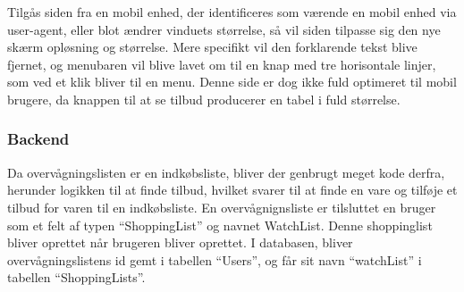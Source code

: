 Tilgås siden fra en mobil enhed, der identificeres som værende en mobil enhed via user-agent, eller blot ændrer vinduets størrelse, så vil siden tilpasse sig den nye skærm opløsning og størrelse.
Mere specifikt vil den forklarende tekst blive fjernet, og menubaren vil blive lavet om til en knap med tre horisontale linjer, som ved et klik bliver til en menu.
Denne side er dog ikke fuld optimeret til mobil brugere, da knappen til at se tilbud producerer en tabel i fuld størrelse. 
\subsubsection{Backend}
Da overvågningslisten er en indkøbsliste, bliver der genbrugt meget kode derfra, herunder logikken til at finde tilbud, hvilket svarer til at finde en vare og tilføje et tilbud for varen til en indkøbsliste. 
En overvågnignsliste er tilsluttet en bruger som et felt af typen ``ShoppingList'' og navnet WatchList. %
Denne shoppinglist bliver oprettet når brugeren bliver oprettet.
I databasen, bliver overvågningslistens id gemt i tabellen ``Users'', og får sit navn ``watchList'' i tabellen ``ShoppingLists''.

